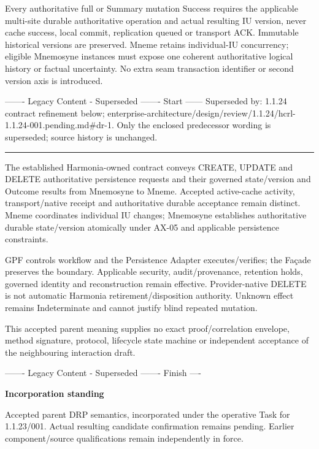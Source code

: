 Every authoritative full or Summary mutation Success requires the applicable multi-site durable authoritative operation and actual resulting IU version, never cache success, local commit, replication queued or transport ACK. Immutable historical versions are preserved. Mneme retains individual-IU concurrency; eligible Mnemosyne instances must expose one coherent authoritative logical history or factual uncertainty. No extra seam transaction identifier or second version axis is introduced.



------- Legacy Content - Superseded ------- Start ------
Superseded by: 1.1.24 contract refinement below; enterprise-architecture/design/review/1.1.24/hcrl-1.1.24-001.pending.md\#dr-1.
Only the enclosed predecessor wording is superseded; source history is unchanged.



\medskip\hrule\medskip


The established Harmonia-owned contract conveys CREATE, UPDATE and DELETE authoritative persistence requests and their governed state/version and Outcome results from Mnemosyne to Mneme. Accepted active-cache activity, transport/native receipt and authoritative durable acceptance remain distinct. Mneme coordinates individual IU changes; Mnemosyne establishes authoritative durable state/version atomically under AX-05 and applicable persistence constraints.



GPF controls workflow and the Persistence Adapter executes/verifies; the Façade preserves the boundary. Applicable security, audit/provenance, retention holds, governed identity and reconstruction remain effective. Provider-native DELETE is not automatic Harmonia retirement/disposition authority. Unknown effect remains Indeterminate and cannot justify blind repeated mutation.



This accepted parent meaning supplies no exact proof/correlation envelope, method signature, protocol, lifecycle state machine or independent acceptance of the neighbouring interaction draft.



------- Legacy Content - Superseded ------- Finish ----



\par\medskip\textbf{Incorporation standing}\par


Accepted parent DRP semantics, incorporated under the operative Task for 1.1.23/001. Actual resulting candidate confirmation remains pending. Earlier component/source qualifications remain independently in force.


